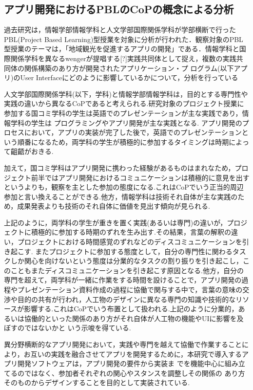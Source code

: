 \documentclass[submit,techrep]{ipsj}
\begin{document}
\subsection{アプリ開発におけるPBLのCoPの概念による分析}
過去研究は，情報学部情報学科と人文学部国際関係学科が学部横断で行ったPBL(Project Based Learning)型授業を対象に分析が行われた．観察対象のPBL型授業のテーマは，「地域観光を促進するアプリの開発」である．情報学科と国際関係学科を異なるwengerが提唱する[?]実践共同体として捉え，複数の実践共同体の関係構築のあり方が開発されたアプリケーション・プ ログラム(以下アプリ)のUser Interfaceにどのように影響しているかについて，分析を行っている\cite{book6}

人文学部国際関係学科(以下，学科)と情報学部情報学科は，目的とする専門性や実践の違いから異なるCoPであると考えられる.研究対象のプロジェクト授業に参加する国コミ学科の学生は英語でのプレゼンテーションが主な実践であり，情報学科の学生は プログラミングやアプリ開発が主な実践となる.  アプリ開発のプロセスにおいて，アプリの実装が完了した後で，英語でのプレゼンテーションという順番になるため，両学科の学生が積極的に参加するタイミングは時期によって齟齬がおきる.

加えて，国コミ学科はアプリ開発に携わった経験があるものはまれなため，プロジェクト前半ではアプリ開発におけるコミュニケーションは積極的に意見を出すというよりも，観察を主とした参加の態度になる.これはCoPでいう正当的周辺参加と言い換えることができる.他方，情報学科は技術それ自体が主な実践のため，成果発表よりも技術のそれ自体に価値を見出す傾向が見られる.

上記のように，両学科の学生が重きを置く実践(あるいは専門)の違いが，プロジェクトに積極的に参加する時期のずれを生み出す.その結果，言葉の解釈の違い，プロジェクトにおける時間感覚のずれなどのディスコミュニケーションを引き起こす.  またプロジェクトに参加する態度として，自分の専門性に関わるタスクしか関心を向けないという態度は分業的なタスクの割り振りを引き起こし，このこともまたディスコミュニケーションを引き起こす原因となる.他方，自分の専門を超えて，両学科が一緒に作業をする時間を設けることで，アプリ開発の過程やプレゼンテーション資料作成の過程に協働で関与する中で，言葉の意味の交渉や目的の共有が行われ，人工物のデザインに異なる専門の知識や技術的なリソースが影響する.これはCoPでいう布置として扱われる.上記のように分業的，あるいは協働的といった関係のあり方がそれ自体が人工物の機能やUIに影響を及ぼすのではないかと いう示唆を得ている.


異分野横断的なアプリ開発において，実践や専門を越えて協働で作業することにより，お互いの実践を融合させてアプリを開発するために，本研究で導入するアプリ開発ソフトウェアは，アプリ開発の要件から実装ま でを機能中心に組み立てるのではなく、参加者それぞれの関心やスタンスを調整しその関係の あり方そのものからデザインすることを目的として実装されている.
\end{document}
